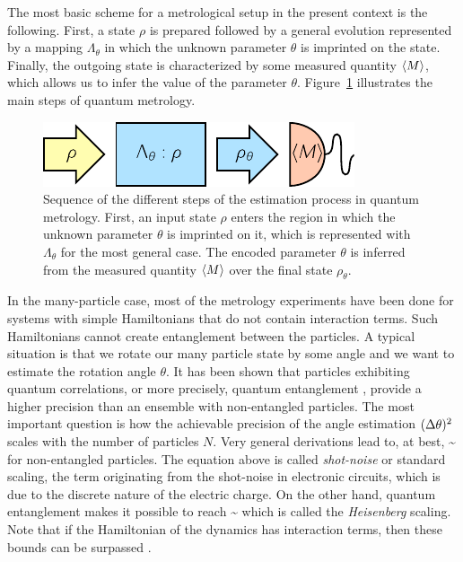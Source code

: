 The most basic scheme for a metrological setup in the present context is the following.
First, a state $\rho$ is prepared followed by a general evolution represented by a mapping $\Lambda_{\theta}$ in which the unknown parameter $\theta$ is imprinted on the state.
Finally, the outgoing state is characterized by some measured quantity $\langle{M}\rangle$, which allows us to infer the value of the parameter $\theta$.
Figure~\ref{fig:bg-preparation-encoding-estimation} illustrates the main steps of quantum metrology.
\begin{figure}[htp]
  \centering
  \includegraphics[scale=1.2]{img/BG_preparation_encoding_estimation.pdf}
  \caption[The estimation process in quantum metrology]{
  Sequence of the different steps of the estimation process in quantum metrology. First, an input state $\rho$ enters the region in which the unknown parameter $\theta$ is imprinted on it, which is represented with $\Lambda_{\theta}$ for the most general case. The encoded parameter $\theta$ is  inferred from the measured quantity $\langle{M}\rangle$ over the final state $\rho_{\theta}$.}
  \label{fig:bg-preparation-encoding-estimation}
\end{figure}

In the many-particle case, most of the metrology experiments have been done for systems with simple Hamiltonians that do not contain interaction terms.
Such Hamiltonians cannot create entanglement between the particles.
A typical situation is that we rotate our many particle state by some angle and we want to estimate the rotation angle $\theta$.
It has been shown that particles exhibiting quantum correlations, or more precisely, quantum entanglement \cite{Guehne2009, Luis2004}, provide a higher precision than an ensemble with non-entangled particles.
The most important question is how the achievable precision of the angle estimation $(\Delta \theta )^2$ scales with the number of particles $N$.
Very general derivations lead to, at best,
\be
  \label{eq:bg-shot-noise-scaling}
  \varian{\theta}\sim {}
\ee
for non-entangled particles.
The equation above is called \emph{shot-noise} or standard scaling, the term originating from the shot-noise in electronic circuits, which is due to the discrete nature of the electric charge.
On the other hand, quantum entanglement makes it possible to reach
\be
  \label{eq:bg-heisenberg-scaling}
  \varian{\theta}\sim {}
\ee
which is called the \emph{Heisenberg} scaling.
Note that if the Hamiltonian of the dynamics has interaction terms, then these bounds can be surpassed \cite{Luis2004, Napolitano2011, Boixo2007, Braun2011, Roy2008, Choi2008, Rey2007}.

